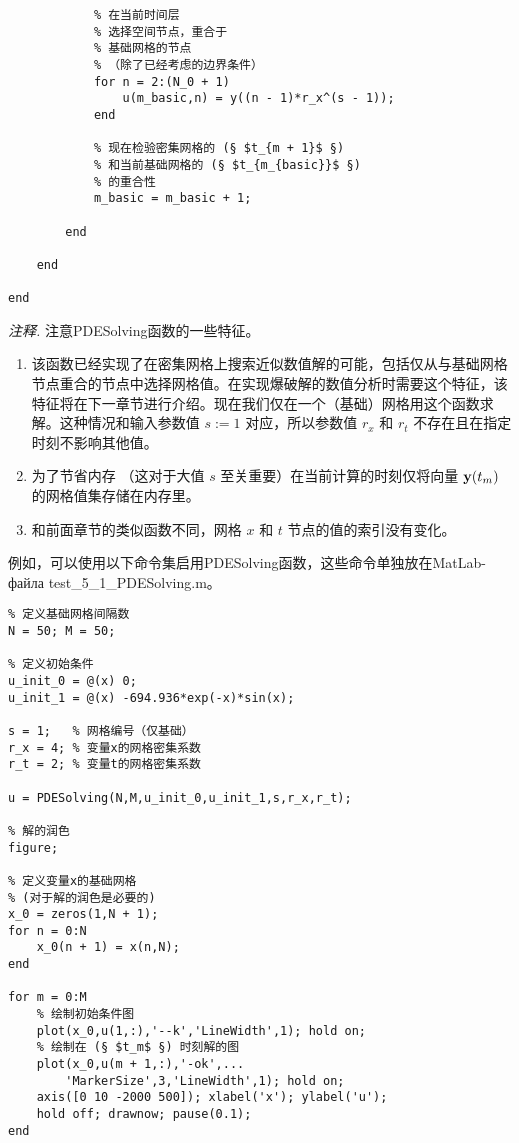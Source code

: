 \documentclass[twoside]{book}
\def\textbf{\bf}%
\begin{document}
\begin{CJK*}{GBK}{song}
\begin{lstlisting}
            % 在当前时间层
            % 选择空间节点，重合于
            % 基础网格的节点
            % （除了已经考虑的边界条件）
            for n = 2:(N_0 + 1)
                u(m_basic,n) = y((n - 1)*r_x^(s - 1));
            end

            % 现在检验密集网格的 (§ $t_{m + 1}$ §)
            % 和当前基础网格的 (§ $t_{m_{basic}}$ §)
            % 的重合性
            m_basic = m_basic + 1;

        end

    end

end
\end{lstlisting}


\emph{注释.} 注意PDESolving函数的一些特征。
\begin{enumerate}
    \item 该函数已经实现了在密集网格上搜索近似数值解的可能，包括仅从与基础网格节点重合的节点中选择网格值。在实现爆破解的数值分析时需要这个特征，该特征将在下一章节进行介绍。现在我们仅在一个（基础）网格用这个函数求解。这种情况和输入参数值 $s := 1$ 对应，所以参数值 $r_x$ 和 $r_t$ 不存在且在指定时刻不影响其他值。

    \item 为了节省内存 （这对于大值 $s$ 至关重要）在当前计算的时刻仅将向量 $\emph{\textbf{y}}(t_m)$ 的网格值集存储在内存里。

    \item 和前面章节的类似函数不同，网格 $x$ 和 $t$ 节点的值的索引没有变化。
\end{enumerate}

例如，可以使用以下命令集启用PDESolving函数，这些命令单独放在MatLab-файла test\_5\_1\_PDESolving.m。
%
\begin{lstlisting}
% 定义基础网格间隔数
N = 50; M = 50;

% 定义初始条件
u_init_0 = @(x) 0;
u_init_1 = @(x) -694.936*exp(-x)*sin(x);

s = 1;   % 网格编号（仅基础）
r_x = 4; % 变量x的网格密集系数
r_t = 2; % 变量t的网格密集系数

u = PDESolving(N,M,u_init_0,u_init_1,s,r_x,r_t);

% 解的润色
figure;

% 定义变量x的基础网格
% (对于解的润色是必要的)
x_0 = zeros(1,N + 1);
for n = 0:N
    x_0(n + 1) = x(n,N);
end

for m = 0:M
    % 绘制初始条件图
    plot(x_0,u(1,:),'--k','LineWidth',1); hold on;
    % 绘制在 (§ $t_m$ §) 时刻解的图
    plot(x_0,u(m + 1,:),'-ok',...
        'MarkerSize',3,'LineWidth',1); hold on;
    axis([0 10 -2000 500]); xlabel('x'); ylabel('u');
    hold off; drawnow; pause(0.1);
end
\end{lstlisting}


\end{CJK*}
\end{document}
